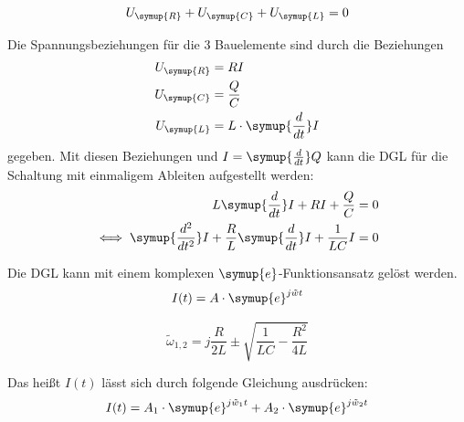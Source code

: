 \documentclass[
  bibliography=totoc,     %
  captions=tableheading,  %
  titlepage=firstiscover, %
]{scrartcl}
\begin{document}
  \begin{equation}
      U_{\symup{R}} + U_{\symup{C}} + U_{\symup{L}}   = 0     
      \label{eqn:masche}
  \end{equation}

  \noindent Die Spannungsbeziehungen für die 3 Bauelemente sind durch die Beziehungen
      \begin{align}
          U_{\symup{R}} & = RI \\
          U_{\symup{C}} & = \frac{Q}{C}\\
          U_{\symup{L}} & = L \cdot \symup{\frac{d}{dt}}I 
      \end{align}
  \noindent gegeben. 
  Mit diesen Beziehungen und $I=\symup{\frac{d}{dt}}Q$ kann die DGL für die Schaltung mit einmaligem Ableiten aufgestellt werden:
  \begin{align}
          L  \symup{\frac{d}{dt}}I + RI + \frac{Q}{C} & = 0 \\
        \iff \symup{\frac{d^2}{dt^2}}I + \frac{R}{L} \symup{\frac{d}{dt}}I + \frac{1}{LC}I & = 0 
          \label{eqn:dgl}
  \end{align}
      
  \noindent Die DGL kann mit einem komplexen $\symup{e}$-Funktionsansatz gelöst werden.
      \begin{equation}
          I(t) = A \cdot \symup{e}^{j \tilde{w} t}
          \label{eqn:dgl2}
      \end{equation}

      \begin{equation}
          \tilde{\omega}_{1,2} = j \frac{R}{2L} \pm \sqrt{\frac{1}{LC}-\frac{R^2}{4L}} 
          \label{eqn:dgl3}
      \end{equation}
      
      \noindent Das heißt $I(t)$ lässt sich durch folgende Gleichung ausdrücken:
      \begin{equation}
          I(t) = A_1 \cdot \symup{e}^{j \tilde{w}_1t} + A_2 \cdot \symup{e}^{j\tilde{w}_2 t} 
      \end{equation}
\end{document}
